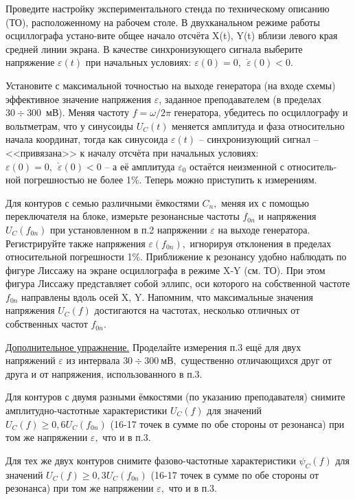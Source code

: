 \begin{lab:task}

    \item Проведите настройку экспериментального стенда по техническому описанию (ТО), рас\-положенному на рабочем столе. В двухканальном режиме работы осциллографа устано-вите общее начало отсчёта X(t), Y(t) вблизи левого края средней линии экрана. В качестве синхронизующего сигнала выберите напряжение $\varepsilon(t)$ при начальных условиях: $\varepsilon(0)=0,~~\dot{\varepsilon}(0)<0.$
    \item Установите с максимальной точностью на выходе генератора (на входе схемы) эффек\-тивное значение напряжения $\varepsilon$, заданное преподавателем (в пределах $30\div300$~мВ). Ме\-няя частоту $f=\omega/2\pi$ генератора, убедитесь по осциллографу и вольтметрам, что у си\-нусоиды $U_C(t)$ меняется амплитуда и фаза относительно начала координат, тогда как синусоида $\varepsilon(t)$ – синхронизующий сигнал – <<привязана>> к началу отсчёта при началь\-ных условиях: $\varepsilon(0)=0,~~\dot{\varepsilon}(0)<0$ – а её амплитуда $\varepsilon_0$ остаётся неизменной с относитель-ной погрешностью не более 1\%. Теперь можно приступить к измерениям.
    \item Для контуров с семью различными ёмкостями $C_n,$ меняя их с помощью переключателя на блоке, измерьте резонансные частоты $f_{0n}$ и напряжения $U_C(f_{0n})$ при установленном в п.2 напряжении $\varepsilon$ на выходе генератора. Регистрируйте также напряжения $\varepsilon(f_{0n}),$ игнорируя отклонения в пределах относительной погрешности 1\%. Приближение к резонансу удобно наблюдать по фигуре Лиссажу на экране осциллографа в режиме X-Y (см. ТО). При этом фигура Лиссажу представляет собой эллипс, оси которого на собственной частоте $f_{0n}$ направлены вдоль осей X, Y. Напомним, что максимальные значения напряжения $U_C(f)$ достигаются на частотах, несколько отличных от собственных частот $f_{0n}.$
    \item \underline{Дополнительное упражнение.} Проделайте измерения п.3 ещё для двух напряжений $\varepsilon$ из интервала $30\div 300~мВ,$ существенно отличающихся друг от друга и от напряжения, использованного в п.3.
    \item Для контуров с двумя разными ёмкостями (по указанию преподавателя) снимите ампли\-тудно-частотные характеристики $U_C(f)$ для значений $U_C(f)\ge0,6U_C(f_{0n})$ (16-17 точек в сумме по обе стороны от резонанса) при том же напряжении $\varepsilon,$ что и в п.3.
    \item Для тех же двух контуров снимите фазово-частотные характеристики $\psi_C(f)$ для значе\-ний $U_C(f)\ge0,3U_C(f_{0n})$ (16-17 точек в сумме по обе стороны от резонанса) при том же напряжении $\varepsilon,$ что и в п.3.


\end{lab:task}
